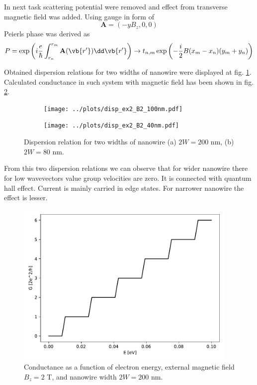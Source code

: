 \documentclass[12pt, a4paper]{article}
\begin{document}
In next task scattering potential were removed and effect from transverse magnetic field was added.
Using gauge in form of 
\[ \mathbf{A} = \left( -yB_z, 0, 0 \right) \]
Peierls phase was derived as
\[ P = \exp\left( i \frac{e}{\hbar} \int_{r_n}^{r_m} \mathbf{A}(\vb{r'}) \dd\vb{r'} \right) \rightarrow t_{n,m}\exp\left( -\frac{i}{2}B(x_m - x_n)(y_m + y_n) \right) \]

Obtained dispersion relations for two widths of nanowire were displayed at fig. \ref{fig:ex2_disp}.
Calculated conductance in such system with magnetic field has been shown in fig. \ref{fig:ex2_conductance}.

\begin{figure}[H]
    \begin{center}
        \begin{subfigure}{0.49\textwidth}
            \texttt{[image: ../plots/disp\_ex2\_B2\_100nm.pdf]}
            \caption{}
        \end{subfigure}
        \begin{subfigure}{0.49\textwidth}
            \texttt{[image: ../plots/disp\_ex2\_B2\_40nm.pdf]}
            \caption{}
        \end{subfigure}
    \end{center}
    \caption{Dispersion relation for two widths of nanowire (a) $2W = 200$ nm, (b) $2W = 80$ nm.}
    \label{fig:ex2_disp}
\end{figure}

From this two dispersion relations we can observe that for wider nanowire there for low wavevectors value group velocities are zero.
It is connected with quantum hall effect.
Current is mainly carried in edge states.
For narrower nanowire the effect is lesser.

\begin{figure}[h]
    \begin{center}
        \includegraphics[width=0.95\textwidth]{../plots/ex2_condutance.pdf}
    \end{center}
    \caption{Conductance as a function of electron energy, external magnetic field $B_z = 2$ T, and nanowire width  $2W = 200$ nm.}
    \label{fig:ex2_conductance}
\end{figure}
\end{document}
